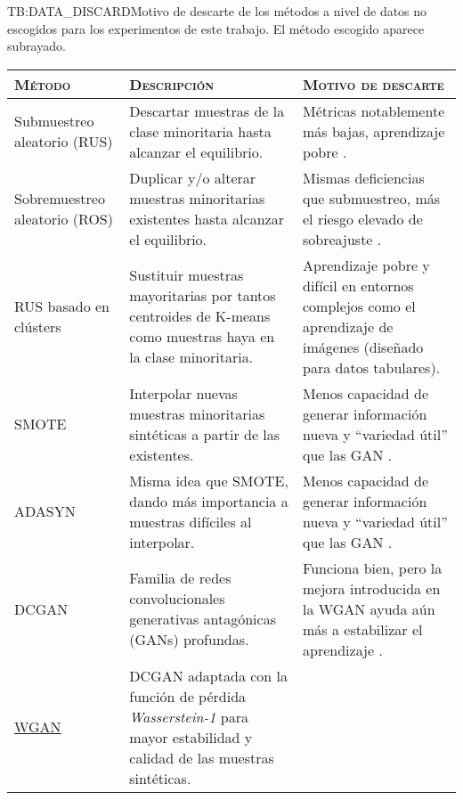 \begin{table}[Motivo de descarte - métodos a nivel de datos]{TB:DATA_DISCARD}{Motivo de descarte de los métodos a nivel de datos no escogidos para los experimentos de este trabajo. El método escogido aparece subrayado.}
    \small
    \begin{tabular}{lp{6.5cm}p{6.5cm}}
        \hline
        \textsc{Método} & \textsc{Descripción} & \textsc{Motivo de descarte} \\
        \hline
        Submuestreo aleatorio (RUS) & Descartar muestras de la clase minoritaria hasta alcanzar el equilibrio. & Métricas notablemente más bajas, aprendizaje pobre \cite{johnson2019survey, upadhyay2021state, nafi2020addressing}. \\ \hline
        Sobremuestreo aleatorio (ROS) & Duplicar y/o alterar muestras minoritarias existentes hasta alcanzar el equilibrio. & Mismas deficiencias que submuestreo, más el riesgo elevado de sobreajuste \cite{johnson2019survey, upadhyay2021state, nafi2020addressing}. \\ \hline
        RUS basado en clústers \cite{lin2017clustering} & Sustituir muestras mayoritarias por tantos centroides de K-means como muestras haya en la clase minoritaria. & Aprendizaje pobre y difícil en entornos complejos como el aprendizaje de imágenes (diseñado para datos tabulares). \\ \hline
        SMOTE \cite{chawla2002smote} & Interpolar nuevas muestras minoritarias sintéticas a partir de las existentes. & Menos capacidad de generar información nueva y ``variedad útil'' que las GAN \cite{nafi2020addressing}. \\ \hline
        ADASYN \cite{he2008adasyn} & Misma idea que SMOTE, dando más importancia a muestras difíciles al interpolar. & Menos capacidad de generar información nueva y ``variedad útil'' que las GAN \cite{nafi2020addressing}. \\ \hline
        DCGAN \cite{nafi2020addressing} & Familia de redes convolucionales generativas antagónicas (GANs) profundas. & Funciona bien, pero la mejora introducida en la WGAN ayuda aún más a estabilizar el aprendizaje \cite{nafi2020addressing}. \\ \hline
        
        
        \underline{WGAN} \cite{arjovsky2017wasserstein} & DCGAN adaptada con la función de pérdida \textit{Wasserstein-1} para mayor estabilidad y calidad de las muestras sintéticas. & \\ \hline
    \end{tabular}
\end{table}

